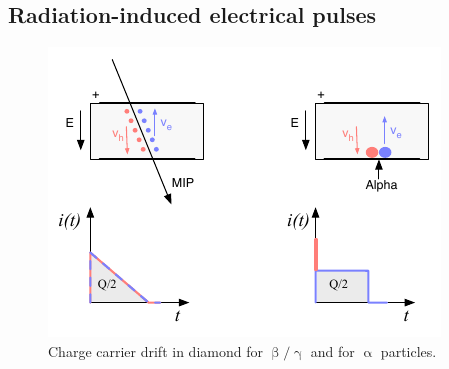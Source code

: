 \subsection{Radiation-induced electrical pulses}

\begin{figure}[!t]
\begin{center}
\includegraphics[width=0.8\linewidth]{02_pulse_formation/pics/plots/driftboth}
\caption{Charge carrier drift in diamond for $\upbeta/\upgamma$ and for $\upalpha$ particles.}
\label{fig:drift}
\end{center}
\end{figure}

